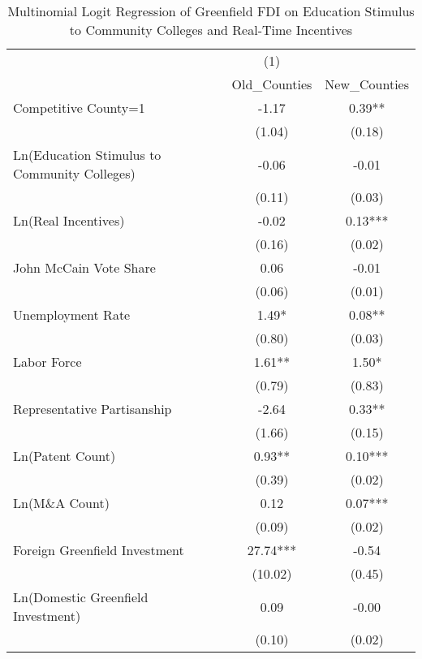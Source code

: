 \begin{table}[!htbp]\centering
\def\sym#1{\ifmmode^{#1}\else\(^{#1}\)\fi}
\caption{Multinomial Logit Regression of Greenfield FDI on Education Stimulus to Community Colleges and Real-Time Incentives}
\begin{tabular}{l*{2}{c}}
\hline\hline
                    &         (1)   &               \\
                    &Old_Counties   &New_Counties   \\
\hline
Competitive County=1&       -1.17   &        0.39** \\
                    &      (1.04)   &      (0.18)   \\
Ln(Education Stimulus to Community Colleges)&       -0.06   &       -0.01   \\
                    &      (0.11)   &      (0.03)   \\
Ln(Real Incentives) &       -0.02   &        0.13***\\
                    &      (0.16)   &      (0.02)   \\
John McCain Vote Share&        0.06   &       -0.01   \\
                    &      (0.06)   &      (0.01)   \\
Unemployment Rate   &        1.49*  &        0.08** \\
                    &      (0.80)   &      (0.03)   \\
Labor Force         &        1.61** &        1.50*  \\
                    &      (0.79)   &      (0.83)   \\
Representative Partisanship&       -2.64   &        0.33** \\
                    &      (1.66)   &      (0.15)   \\
Ln(Patent Count)    &        0.93** &        0.10***\\
                    &      (0.39)   &      (0.02)   \\
Ln(M\&A Count)      &        0.12   &        0.07***\\
                    &      (0.09)   &      (0.02)   \\
Foreign Greenfield Investment&       27.74***&       -0.54   \\
                    &     (10.02)   &      (0.45)   \\
Ln(Domestic Greenfield Investment)&        0.09   &       -0.00   \\
                    &      (0.10)   &      (0.02)   \\

\end{tabular}
\end{table}
